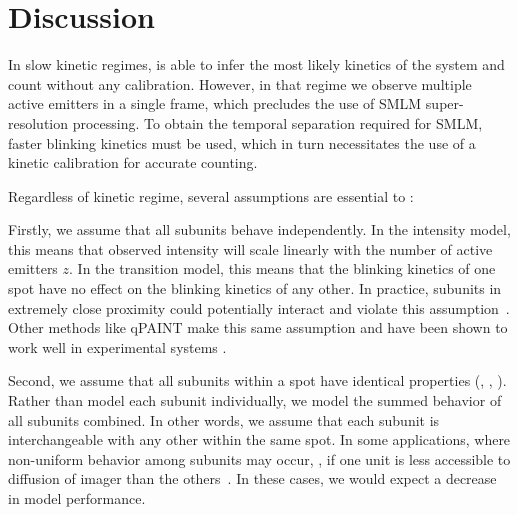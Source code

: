 \section{Discussion} \label{discussion}

In slow kinetic regimes, \ours is able to infer the most likely kinetics of the
system and count without any calibration.
  However, in that regime we observe multiple active emitters in a single
  frame, which precludes the use of SMLM super-resolution processing.
  To obtain the temporal separation required for SMLM, faster blinking kinetics must be used, 
  which in turn necessitates the use of a kinetic calibration for accurate counting.



Regardless of kinetic regime, several assumptions are essential to \ours:

  Firstly, we assume that all subunits behave independently.
  In the intensity model, this means that observed intensity will scale
  linearly with the number of active emitters $z$.
  In the transition model, this means that the blinking kinetics of one spot
  have no effect on the blinking kinetics of any other.
  In practice, subunits in extremely close proximity could
  potentially interact and violate this assumption~\citep{helmerich_photoswitching_2022}. 
  Other methods like qPAINT make this same assumption and have been shown to
  work well in experimental systems \citep{fischer_quantitative_2021,
  jayasinghe_true_2018}. 

  Second, we assume that all subunits within a spot have identical properties
  (\pon, \poff, \re).
  Rather than model each subunit individually, we model the summed behavior
  of all subunits combined. 
  In other words, we assume that each subunit is
  interchangeable with any other within the same spot.
  In some applications, where non-uniform behavior among subunits may occur, \eg,
  if one unit is less accessible to diffusion of
  imager than the others~\citep{civitci_2020}. 
  In these cases, we would expect a decrease in model performance.

